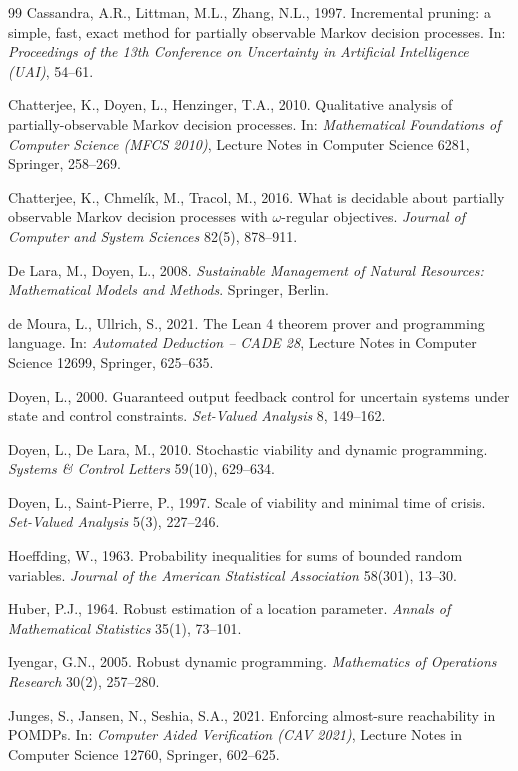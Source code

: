 \documentclass[11pt,a4paper]{article}
\theoremstyle{plain}
\theoremstyle{definition}
\theoremstyle{remark}
\begin{document}
\begin{thebibliography}{99}
 Cassandra, A.R., Littman, M.L., Zhang, N.L., 1997. Incremental pruning: a simple, fast, exact method for partially observable Markov decision processes. In: \emph{Proceedings of the 13th Conference on Uncertainty in Artificial Intelligence (UAI)}, 54--61.

 Chatterjee, K., Doyen, L., Henzinger, T.A., 2010. Qualitative analysis of partially-observable Markov decision processes. In: \emph{Mathematical Foundations of Computer Science (MFCS 2010)}, Lecture Notes in Computer Science 6281, Springer, 258--269.

 Chatterjee, K., Chmel\'ik, M., Tracol, M., 2016. What is decidable about partially observable Markov decision processes with $\omega$-regular objectives. \emph{Journal of Computer and System Sciences} 82(5), 878--911.

 De Lara, M., Doyen, L., 2008. \emph{Sustainable Management of Natural Resources: Mathematical Models and Methods}. Springer, Berlin.

 de Moura, L., Ullrich, S., 2021. The Lean 4 theorem prover and programming language. In: \emph{Automated Deduction -- CADE 28}, Lecture Notes in Computer Science 12699, Springer, 625--635.

 Doyen, L., 2000. Guaranteed output feedback control for uncertain systems under state and control constraints. \emph{Set-Valued Analysis} 8, 149--162.

 Doyen, L., De Lara, M., 2010. Stochastic viability and dynamic programming. \emph{Systems \& Control Letters} 59(10), 629--634.

 Doyen, L., Saint-Pierre, P., 1997. Scale of viability and minimal time of crisis. \emph{Set-Valued Analysis} 5(3), 227--246.

 Hoeffding, W., 1963. Probability inequalities for sums of bounded random variables. \emph{Journal of the American Statistical Association} 58(301), 13--30.

 Huber, P.J., 1964. Robust estimation of a location parameter. \emph{Annals of Mathematical Statistics} 35(1), 73--101.

 Iyengar, G.N., 2005. Robust dynamic programming. \emph{Mathematics of Operations Research} 30(2), 257--280.

 Junges, S., Jansen, N., Seshia, S.A., 2021. Enforcing almost-sure reachability in POMDPs. In: \emph{Computer Aided Verification (CAV 2021)}, Lecture Notes in Computer Science 12760, Springer, 602--625.


\end{thebibliography}
\end{document}
